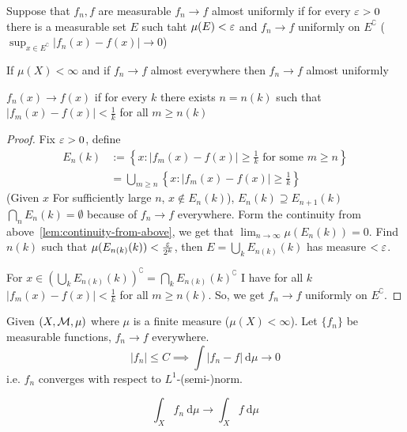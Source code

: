 \begin{definition}
  Suppose that $f_n, f$ are measurable
  $f_n \to f$ almost uniformly if for every $\varepsilon > 0$
  there is a measurable set $E$ such taht $\mu(E) < \varepsilon$ and $f_n \to f$ uniformly on $E^\complement$
  ($\sup_{x\in E^\complement} |f_n(x) - f(x)| \to 0$)
\end{definition}

\begin{theorem}
  If $\mu(X) < \infty$ and if $f_n \to f$ almost everywhere then 
  $f_n \to f$ almost uniformly
\end{theorem}

\begin{remark}
  $f_n(x) \to f(x)$ if for every $k$ there exists $n = n(k)$ such that
  $|f_m(x) - f(x)| < \frac1k$ for all $m \ge n(k)$
\end{remark}

\begin{proof}
  Fix $\varepsilon > 0$, define 
  \begin{align*}
    E_n(k) &:= \left\{x : |f_m(x) - f(x)| \ge \frac1k \text{ for some }m \ge n\right\} \\
    &= \bigcup_{m \ge n} \left\{x : |f_m(x) - f(x)| \ge \frac1k\right\}
  \end{align*}
  (Given $x$ For sufficiently large $n$, $x \notin E_n(k)$), $E_n(k) \supseteq E_{n+1}(k)$
  $\bigcap_n E_n(k) = \emptyset$ because of $f_n \to f$ everywhere.
  Form the continuity from above~\ref{lem:continuity-from-above}, we get that $\lim_{n\to\infty}\mu(E_n(k)) = 0$.
  Find $n(k)$ such that $\mu(E_{n(k)}(k)) < \frac{\varepsilon}{2^k}$, then $E = \bigcup_k E_{n(k)}(k)$ has measure $< \varepsilon$.
  
  For $x\in \left(\bigcup_k E_{n(k)}(k)\right)^\complement = \bigcap_k E_{n(k)}(k)^\complement$
  I have for all $k$ $|f_m(x) - f(x)| < \frac1k$ for all $m \ge n(k)$.
  So, we get $f_n \to f$ uniformly on $E^\complement$.
\end{proof}

\begin{theorem}
  Given $(X, \mathcal M, \mu)$ where $\mu$ is a finite measure ($\mu(X) < \infty$).
  Let $\{f_n\}$ be measurable functions, $f_n \to f$ everywhere.
  \[|f_n| \le C \implies \int |f_n - f| \ \mathrm{d}\mu \to 0\]
  i.e. $f_n$ converges with respect to $L^1$-(semi-)norm.
\end{theorem}

\begin{corollary}
  \[\int_X f_n\ \mathrm{d}\mu \to \int_X f \ \mathrm{d}\mu\]
\end{corollary}

